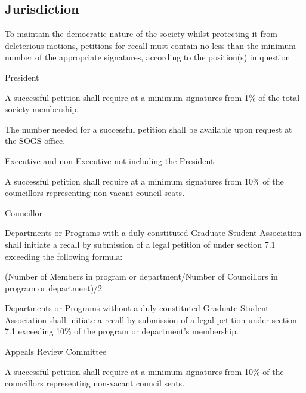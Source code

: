 \subsection{Jurisdiction}
To maintain the democratic nature of the society whilst protecting it from deleterious motions, petitions for recall must contain no less than the minimum number of the appropriate signatures, according to the position(s) in question

\begin{longenum}[ label*=\thesubsection.\arabic*., align=left]
	\item President
    \begin{longenum}[ label*=\arabic*., align=left]
		\item A successful petition shall require at a minimum signatures from 1\% of the total society membership.
    	\begin{longenum}[ label*=\arabic*., align=left]
			\item The number needed for a successful petition shall be available upon request at the SOGS office.
		\end{longenum}
	\end{longenum}
   \item Executive and non-Executive not including the President
    \begin{longenum}[ label*=\arabic*., align=left]
		\item A successful petition shall require at a minimum signatures from 10\% of the councillors representing non-vacant council seats.
	\end{longenum}
	\item Councillor
    \begin{longenum}[ label*=\arabic*., align=left]
		\item Departments or Programs with a duly constituted Graduate Student Association shall initiate a recall by submission of a legal petition of under section 7.1 exceeding the following formula: \newline
        
(Number of Members in program or department/Number of Councillors in program or department)/2
	\item Departments or Programs without a duly constituted Graduate Student Association shall initiate a recall by submission of a legal petition under section 7.1 exceeding 10\% of the program or department's membership.
	\end{longenum}    
	\item Appeals Review Committee
    \begin{longenum}[ label*=\arabic*., align=left]
		\item A successful petition shall require at a minimum signatures from 10\% of the councillors representing non-vacant council seats.
	\end{longenum}
\end{longenum}

